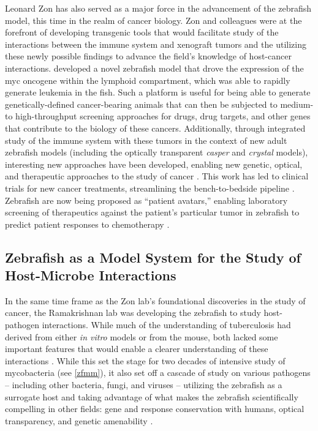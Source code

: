 Leonard Zon has also served as a major force in the advancement of the zebrafish model, this time in the realm of cancer biology. Zon and colleagues were at the forefront of developing transgenic tools that would facilitate study of the interactions between the immune system and xenograft tumors and the utilizing these newly possible findings to advance the field's knowledge of host-cancer interactions. \citet{Cagan2019, Amatruda2002, Langenau2003, Trede2004, McConnell2021} developed a novel zebrafish model that drove the expression of the myc oncogene within the lymphoid compartment, which was able to rapidly generate leukemia in the fish. Such a platform is useful for being able to generate genetically-defined cancer-bearing animals that can then be subjected to medium- to high-throughput screening approaches for drugs, drug targets, and other genes that contribute to the biology of these cancers. Additionally, through integrated study of the immune system with these tumors in the context of new adult zebrafish models (including the optically transparent \textit{casper} and \textit{crystal} models), interesting new approaches have been developed, enabling new genetic, optical, and therapeutic approaches to the study of cancer \citep{Yan2021, Yan2019, Stern2003, GomezAbenza2019, Hason2019, White2013}. This work has led to clinical trials for new cancer treatments, streamlining the bench-to-bedside pipeline \citep{Hanna2021}. Zebrafish are now being proposed as ``patient avatars,'' enabling laboratory screening of therapeutics against the patient's particular tumor in zebrafish to predict patient responses to chemotherapy \citep{Li2012, Yan2019, Fazio2020}.

\subsection{Zebrafish as a Model System for the Study of Host-Microbe Interactions}

In the same time frame as the Zon lab's foundational discoveries in the study of cancer, the Ramakrishnan lab was developing the zebrafish to study host-pathogen interactions. While much of the understanding of tuberculosis had derived from either \textit{in vitro} models or from the mouse, both lacked some important features that would enable a clearer understanding of these interactions \citep{Davis2002}. While this set the stage for two decades of intensive study of mycobacteria (see \autoref{zfmm}), it also set off a cascade of study on various pathogens -- including other bacteria, fungi, and viruses -- utilizing the zebrafish as a surrogate host and taking advantage of what makes the zebrafish scientifically compelling in other fields: gene and response conservation with humans, optical transparency, and genetic amenability \citep{Kanther2010, Angosto2014}.

